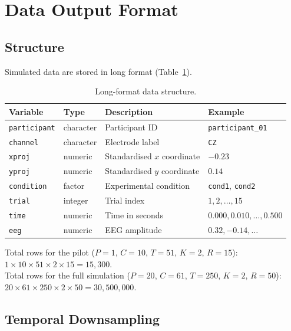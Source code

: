 \documentclass[12pt, a4paper]{article}
\begin{document}
\section{Data Output Format}\label{sec:output}

\subsection{Structure}

Simulated data are stored in long format (Table~\ref{tab:output_cols}).

\begin{table}[ht]
\centering
\caption{Long-format data structure.}
\label{tab:output_cols}
\small
\begin{tabular}{llll}
\toprule
\textbf{Variable} & \textbf{Type} & \textbf{Description} & \textbf{Example} \\
\midrule
\texttt{participant} & character & Participant ID & \texttt{participant\_01} \\
\texttt{channel}     & character & Electrode label & \texttt{CZ} \\
\texttt{xproj}       & numeric   & Standardised $x$ coordinate & $-0.23$ \\
\texttt{yproj}       & numeric   & Standardised $y$ coordinate & $0.14$ \\
\texttt{condition}   & factor    & Experimental condition & \texttt{cond1}, \texttt{cond2} \\
\texttt{trial}       & integer   & Trial index & $1, 2, \ldots, 15$ \\
\texttt{time}        & numeric   & Time in seconds & $0.000, 0.010, \ldots, 0.500$ \\
\texttt{eeg}         & numeric   & EEG amplitude & $0.32, -0.14, \ldots$ \\
\bottomrule
\end{tabular}
\end{table}

Total rows for the pilot ($P=1$, $C=10$, $T=51$, $K=2$, $R=15$):
$1 \times 10 \times 51 \times 2 \times 15 = 15{,}300$.\\
Total rows for the full simulation ($P=20$, $C=61$, $T=250$, $K=2$, $R=50$):
$20 \times 61 \times 250 \times 2 \times 50 = 30{,}500{,}000$.

\subsection{Temporal Downsampling}\label{sec:downsample}
\end{document}
